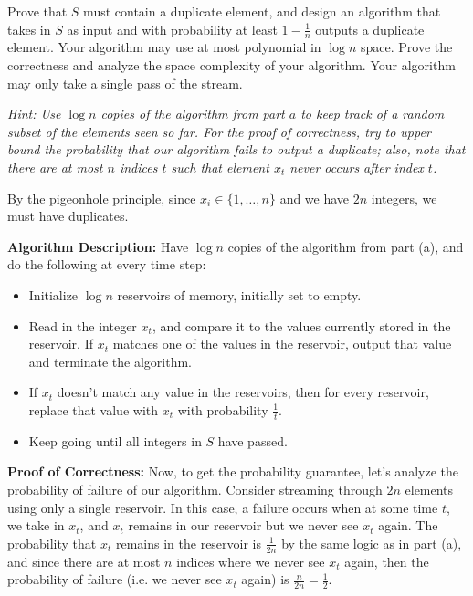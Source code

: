 \documentclass[11pt]{article}
\begin{document}
\begin{subparts}
	Prove that $S$ must contain a duplicate element, and design an algorithm that takes in $S$ as input and with probability at least $1-\frac{1}{n}$ outputs a duplicate element.  Your algorithm may use at most polynomial in $\log n$ space.  Prove the correctness and analyze the space complexity of your algorithm.  Your algorithm may only take a single pass of the stream.
	
	\textit{Hint: Use $\log n$ copies of the algorithm from part $a$ to keep track of a random subset of the elements seen so far. For the proof of correctness, try to upper bound the probability that our algorithm fails to output a duplicate; also, note that there are at most $n$ indices $t$ such that element $x_t$ never occurs after index $t$.}

	\begin{solution}
		By the pigeonhole principle, since \( x_i \in \{1, \dots, n\}  \) and we have \( 2n \) integers, 
		we must have duplicates. 

		\textbf{Algorithm Description:} Have \( \log n \) copies of the algorithm from part (a), and do the following at every time
		step:
		\begin{itemize}
			\item Initialize \( \log n \) reservoirs of memory, initially set to empty. 
			\item Read in the integer \( x_t \), and compare it to the values currently stored in the reservoir. If \( x_t \) matches
				one of the values in the reservoir, output that value and terminate the algorithm. 
			\item If \( x_t \) doesn't match any value in the reservoirs, then for every reservoir, replace that value with 
				\( x_t \) with probability \( \frac{1}{t} \). 
			\item Keep going until all integers in \( S \) have passed. 
		\end{itemize}
		\textbf{Proof of Correctness:} Now, to get the probability guarantee, 
		let's analyze the probability of failure of our algorithm. Consider streaming through \( 2n \) elements using 
		only a single reservoir. In this case, 
		a failure occurs when at some time \( t \), we take in \( x_t \), and \( x_t \) remains in our reservoir but we never 
		see \( x_t \) again. The probability that \( x_t \) remains in the reservoir is \( \frac{1}{2n} \) by the 
		same logic as in part (a), and since there are 
		at most \( n \) indices where we never see \( x_t \) again, then the probability of failure 
		(i.e. we never see \( x_t \) again) is  
		\( \frac{n}{2n} = \frac{1}{2} \). 
		

\end{solution}
\end{subparts}
\end{document}
